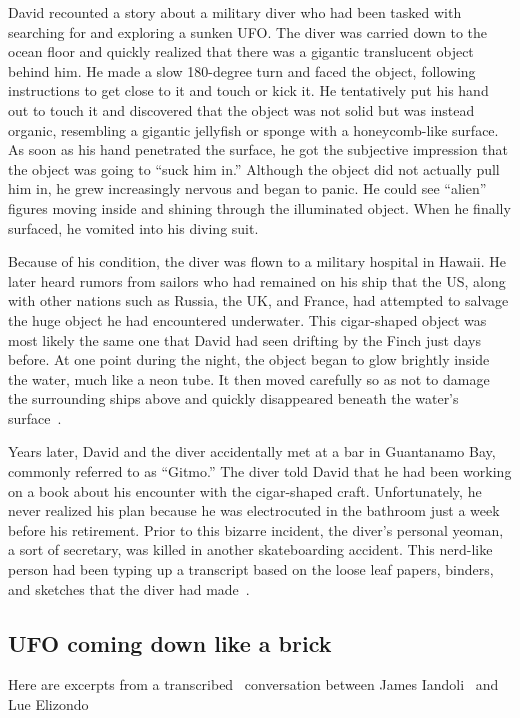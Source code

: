 David recounted a story about a military diver who had been tasked with searching for and exploring a sunken UFO. The diver was carried down to the ocean floor and quickly realized that there was a gigantic translucent object behind him. He made a slow 180-degree turn and faced the object, following instructions to get close to it and touch or kick it. He tentatively put his hand out to touch it and discovered that the object was not solid but was instead organic, resembling a gigantic jellyfish or sponge with a honeycomb-like surface. As soon as his hand penetrated the surface, he got the subjective impression that the object was going to ``suck him in.'' Although the object did not actually pull him in, he grew increasingly nervous and began to panic. He could see ``alien'' figures moving inside and shining through the illuminated object. When he finally surfaced, he vomited into his diving suit.

Because of his condition, the diver was flown to a military hospital in Hawaii.
He later heard rumors from sailors who had remained on his ship that the US, along with other nations such as Russia,
the UK, and France, had attempted to salvage the huge object he had encountered underwater. This cigar-shaped object was most likely
the same one that David had seen drifting by the Finch just days before. At one point during the night,
the object began to glow brightly inside the water, much like a neon tube. It then moved carefully so as not to damage
the surrounding ships above and quickly disappeared beneath the water's surface~\cite{Hein2018Dec}.


Years later, David and the diver accidentally met at a bar in Guantanamo Bay, commonly referred to as ``Gitmo.''
The diver told David that he had been working on a book about his encounter with the cigar-shaped craft.
Unfortunately, he never realized his plan because he was electrocuted in the bathroom just a week before his retirement.
Prior to this bizarre incident, the diver's personal yeoman, a sort of secretary, was killed in another skateboarding accident.
This nerd-like person had been typing up a transcript based on the loose leaf papers,
binders, and sketches that the diver had made~\cite{Hein2018Dec}.


\subsection{UFO coming down like a brick}


Here are excerpts from a transcribed~\cite[pp.~69,70]{Penetrator2022NovLooseThreads}
conversation between James Iandoli~ and  Lue Elizondo
~\cite[time:~38:19 min:sec]{Iandoli-Elizondo-Starfish-prime}

